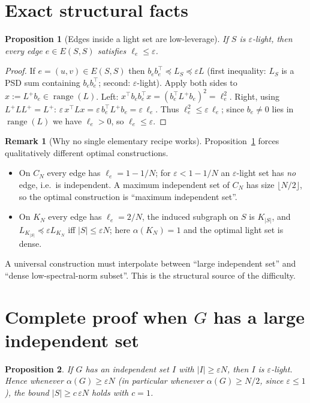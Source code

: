 \documentclass[12pt]{article}
\DeclareMathOperator{\range}{range}
\newcommand{\eps}{\varepsilon}
\newtheorem{proposition}{Proposition}
\theoremstyle{definition}
\newtheorem{remark}{Remark}
\begin{document}
\section{Exact structural facts}

\begin{proposition}[Edges inside a light set are low-leverage]\label{prop:nec}
If $S$ is $\eps$-light, then every edge $e\in E(S,S)$ satisfies $\ell_e\le\eps$.
\end{proposition}

\begin{proof}
If $e=(u,v)\in E(S,S)$ then $b_eb_e^{\top}\preceq L_S\preceq\eps L$ (first
inequality: $L_S$ is a PSD sum containing $b_eb_e^{\top}$; second: $\eps$-light).
Apply both sides to $x:=L^{+}b_e\in\range(L)$. Left: $x^{\top}b_eb_e^{\top}x
=(b_e^{\top}L^{+}b_e)^2=\ell_e^2$. Right, using $L^{+}LL^{+}=L^{+}$:
$\eps\,x^{\top}Lx=\eps\,b_e^{\top}L^{+}b_e=\eps\,\ell_e$. Thus
$\ell_e^2\le\eps\,\ell_e$; since $b_e\neq0$ lies in $\range(L)$ we have
$\ell_e>0$, so $\ell_e\le\eps$.
\end{proof}

\begin{remark}[Why no single elementary recipe works]\label{rem:dichotomy}
Proposition~\ref{prop:nec} forces qualitatively different optimal constructions.
\begin{itemize}
\item On $C_N$ every edge has $\ell_e=1-1/N$; for $\eps<1-1/N$ an $\eps$-light
set has \emph{no} edge, i.e.\ is independent. A maximum independent set of $C_N$
has size $\lfloor N/2\rfloor$, so the optimal construction is ``maximum
independent set''.
\item On $K_N$ every edge has $\ell_e=2/N$, the induced subgraph on $S$ is
$K_{|S|}$, and $L_{K_{|S|}}\preceq\eps L_{K_N}$ iff $|S|\le\eps N$; here
$\alpha(K_N)=1$ and the optimal light set is dense.
\end{itemize}
A universal construction must interpolate between ``large independent set'' and
``dense low-spectral-norm subset''. This is the structural source of the
difficulty.
\end{remark}

\section{Complete proof when $G$ has a large independent set}

\begin{proposition}\label{prop:indep}
If $G$ has an independent set $I$ with $|I|\ge\eps N$, then $I$ is $\eps$-light.
Hence whenever $\alpha(G)\ge\eps N$ (in particular whenever $\alpha(G)\ge N/2$,
since $\eps\le1$), the bound $|S|\ge c\,\eps N$ holds with $c=1$.
\end{proposition}
\end{document}
